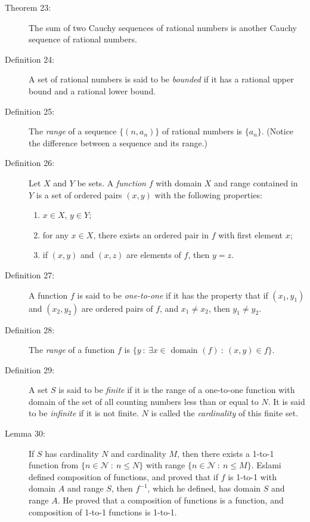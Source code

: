\documentclass{article}
\begin{document}
\begin{description}
  \item[Theorem 23:] The sum of two Cauchy sequences of rational numbers is another Cauchy sequence of rational numbers.

  \item[Definition 24:] A set of rational numbers is said to be \emph{bounded} if it has a rational upper bound and a rational lower bound.

  \item[Definition 25:] The \emph{range} of a sequence $\{ (n, a_{n}) \}$ of rational numbers is $\{ a_{n} \}$. (Notice the difference between a sequence and its range.)

  \item[Definition 26:] Let $X$ and $Y$ be sets. A \emph{function} $f$ with domain $X$ and range contained in $Y$ is a set of ordered pairs $(x,y)$ with the following properties:
    \begin{enumerate}[\hspace{1cm}1.]
      \item $x \in X$, $y \in Y$;
      \item for any $x \in X$, there exists an ordered pair in $f$ with first element $x$;
      \item if $(x,y)$ and $(x,z)$ are elements of $f$, then $y=z$.
    \end{enumerate}

  \item[Definition 27:] A function $f$ is said to be \emph{one-to-one} if it has the property that if $(x_{1}, y_{1})$ and $(x_{2}, y_{2})$ are ordered pairs of $f$, and $x_{1} \neq x_{2}$, then $y_{1} \neq y_{2}$.

  \item[Definition 28:] The \emph{range} of a function $f$ is $\{ y\ :\ \exists x \in \text{ domain } (f)\ :\ (x,y) \in f \}$.

  \item[Definition 29:] A set $S$ is said to be \emph{finite} if it is the range of a one-to-one function with domain of the set of all counting numbers less than or equal to $N$. It is said to be \emph{infinite} if it is not finite. $N$ is called the \emph{cardinality} of this finite set.

  \item[Lemma 30:] If $S$ has cardinality $N$ and cardinality $M$, then there exists a 1-to-1 function from $\{ n \in \mathcal{N}\ :\ n \leq N \}$ with range $\{ n \in \mathcal{N}\ :\ n \leq M \}$. Eslami defined composition of functions, and proved that if $f$ is 1-to-1 with domain $A$ and range $S$, then $f^{-1}$, which he defined, has domain $S$ and range $A$. He proved that a composition of functions is a function, and composition of 1-to-1 functions is 1-to-1.


\end{description}
\end{document}
